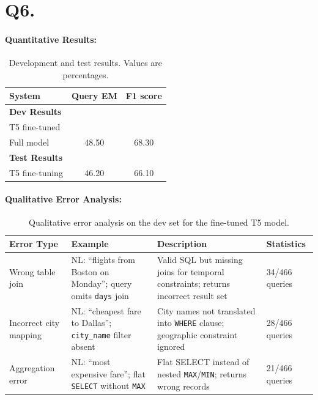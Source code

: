 \documentclass{article}
\begin{document}
\section*{Q6.}
\label{Q6}

\paragraph{Quantitative Results:}
\begin{table}[h!]
\centering
\begin{tabular}{lcc}
  \toprule
  System & Query EM & F1 score \\
  \midrule
  \multicolumn{3}{l}{\textbf{Dev Results}} \\
  \midrule
  \multicolumn{3}{l}{T5 fine-tuned} \\
  Full model & 48.50 & 68.30 \\
  \midrule
  \multicolumn{3}{l}{\textbf{Test Results}} \\
  \midrule
  T5 fine-tuning & 46.20 & 66.10 \\
  \bottomrule
\end{tabular}
\caption{Development and test results. Values are percentages.}
\label{tab:results}
\end{table}

\paragraph{Qualitative Error Analysis:}

\begin{table}[h!]
  \centering
  \small
  \setlength{\tabcolsep}{4pt}
  \begin{tabular}{p{2.0cm}p{3.2cm}p{4.0cm}p{2.8cm}}
    \toprule
    \textbf{Error Type} & \textbf{Example} & \textbf{Description} & \textbf{Statistics} \\
    \midrule
    Wrong table join &
      NL: ``flights from Boston on Monday''; query omits \texttt{days} join &
      Valid SQL but missing joins for temporal constraints; returns incorrect result set &
      34/466 queries \\
    \midrule
    Incorrect city mapping &
      NL: ``cheapest fare to Dallas''; \texttt{city\_name} filter absent &
      City names not translated into \texttt{WHERE} clause; geographic constraint ignored &
      28/466 queries \\
    \midrule
    Aggregation error &
      NL: ``most expensive fare''; flat \texttt{SELECT} without \texttt{MAX} &
      Flat SELECT instead of nested \texttt{MAX}/\texttt{MIN}; returns wrong records &
      21/466 queries \\
    \bottomrule
  \end{tabular}
  \caption{Qualitative error analysis on the dev set for the fine-tuned T5 model.}
  \label{tab:qualitative}
\end{table}
\end{document}
